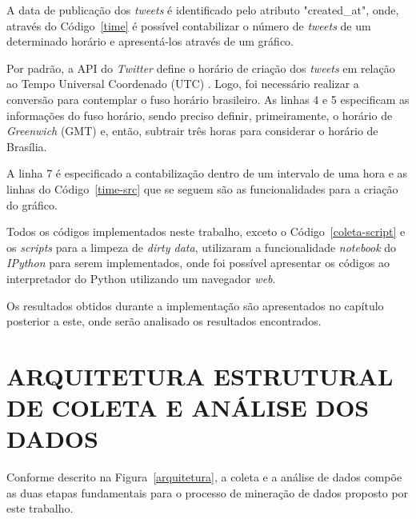 

A data de publicação dos \textit{tweets} é identificado pelo atributo "created\_at", onde, através do Código~\ref{time} é possível contabilizar o número de \textit{tweets} de um determinado horário e apresentá-los através de um gráfico.

Por padrão, a API do \textit{Twitter} define o horário de criação dos \textit{tweets} em relação ao Tempo Universal Coordenado (UTC) \cite{twitter-doc}. Logo, foi necessário realizar a conversão para contemplar o fuso horário brasileiro. As linhas 4 e 5 especificam as informações do fuso horário, sendo preciso definir, primeiramente, o horário de \textit{Greenwich} (GMT) e, então, subtrair três horas para considerar o horário de Brasília.

A linha 7 é especificado a contabilização dentro de um intervalo de uma hora e as linhas do Código~\ref{time-src} que se seguem são as funcionalidades para a criação do gráfico.



Todos os códigos implementados neste trabalho, exceto o Código~\ref{coleta-script} e os \textit{scripts} para a limpeza de \textit{dirty data}, utilizaram a funcionalidade \textit{notebook} do \textit{IPython} para serem implementados, onde foi possível apresentar os códigos ao interpretador do Python utilizando um navegador \textit{web}.

Os resultados obtidos durante a implementação são apresentados no capítulo posterior a este, onde serão analisado os resultados encontrados.

\section{ARQUITETURA ESTRUTURAL DE COLETA E ANÁLISE DOS DADOS}
Conforme descrito na Figura~\ref{arquitetura}, a coleta e a análise de dados compõe as duas etapas fundamentais para o processo de mineração de dados proposto por este trabalho.

